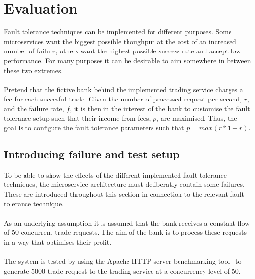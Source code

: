 \section{Evaluation}
Fault tolerance techniques can be implemented for different
purposes. Some microservices want the biggest possible thoughput at
the cost of an increased number of failure, others want the highest
possible success rate and accept low performance. For many purposes it
can be desirable to aim somewhere in between these two extremes.
\\\\
Pretend that the fictive bank behind the implemented trading service
charges a fee for each succesful trade. Given the number of processed
request per second, $r$, and the failure rate, $f$, it is then in the
interest of the bank to customise the fault tolerance setup such that
their income from fees, $p$, are maximised. Thus, the goal is to
configure the fault tolerance parameters such that $p = max(r *
1-r)$.

\subsection{Introducing failure and test setup}
To be able to show the effects of the different implemented fault
tolerance techniques, the microservice architecture must deliberatly
contain some failures. These are introduced throughout this section in
connection to the relevant fault tolerance technique.
\\\\
As an underlying assumption it is assumed that the bank receives a
constant flow of 50 concurrent trade requests. The aim of the bank is
to process these requests in a way that optimises their profit.
\\\\
The system is tested by using the Apache HTTP server benchmarking
tool~\cite{apache} to generate 5000 trade request to the trading
service at a concurrency level of 50.

